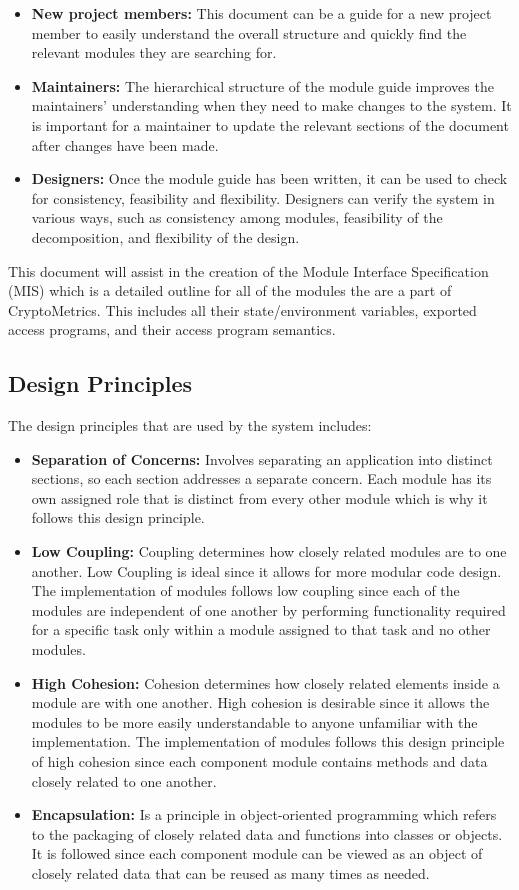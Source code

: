 \documentclass[12pt, titlepage]{article}
\begin{document}
\begin{itemize}
\item \textbf{New project members:} This document can be a guide for a new project member
  to easily understand the overall structure and quickly find the
  relevant modules they are searching for.
\item \textbf{Maintainers:} The hierarchical structure of the module guide improves the
  maintainers' understanding when they need to make changes to the system. It is
  important for a maintainer to update the relevant sections of the document
  after changes have been made.
\item \textbf{Designers:} Once the module guide has been written, it can be used to
  check for consistency, feasibility and flexibility. Designers can verify the
  system in various ways, such as consistency among modules, feasibility of the
  decomposition, and flexibility of the design.
\end{itemize}

This document will assist in the creation of the Module Interface Specification (MIS) which is a detailed outline for all of the modules the are a part of CryptoMetrics. This includes all their state/environment variables, exported access programs, and their access program semantics. 

\subsection{Design Principles}

The design principles that are used by the system includes:  

\begin{itemize}
\item \textbf{Separation of Concerns:} Involves separating an application into distinct sections, so each section addresses a separate concern. Each module has its own assigned role that is distinct from every other module which is why it follows this design principle. 
\item \textbf{Low Coupling:} Coupling determines how closely related modules are to one another. Low Coupling is ideal since it allows for more modular code design. The implementation of modules follows low coupling since each of the modules are independent of one another by performing functionality required for a specific task only within a module assigned to that task and no other modules. 
\item \textbf{High Cohesion:} Cohesion determines how closely related elements inside a module are with one another. High cohesion is desirable since it allows the modules to be more easily understandable to anyone unfamiliar with the implementation. The implementation of modules follows this design principle of high cohesion since each component module contains methods and data closely related to one another.
\item \textbf{Encapsulation:} Is a principle in object-oriented programming which refers to the packaging of closely related data and functions into classes or objects. It is followed since each component module can be viewed as an object of closely related data that can be reused as many times as needed.
\end{itemize}
\end{document}
